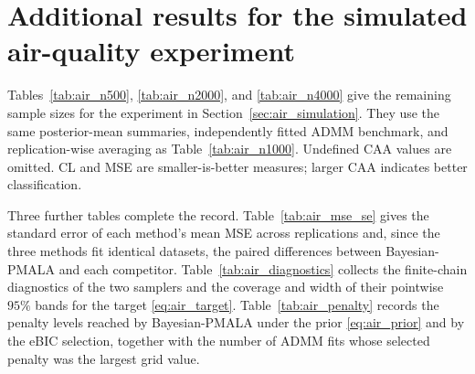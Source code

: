 \clearpage
\section{Additional results for the simulated air-quality experiment}
\label{app:air_simulation}

Tables~\ref{tab:air_n500}, \ref{tab:air_n2000}, and \ref{tab:air_n4000} give the remaining sample sizes for the experiment in Section~\ref{sec:air_simulation}. They use the same posterior-mean summaries, independently fitted ADMM benchmark, and replication-wise averaging as Table~\ref{tab:air_n1000}. Undefined CAA values are omitted. CL and MSE are smaller-is-better measures; larger CAA indicates better classification.

Three further tables complete the record. Table~\ref{tab:air_mse_se} gives the standard error of each method's mean MSE across replications and, since the three methods fit identical datasets, the paired differences between Bayesian-PMALA and each competitor. Table~\ref{tab:air_diagnostics} collects the finite-chain diagnostics of the two samplers and the coverage and width of their pointwise $95\%$ bands for the target \eqref{eq:air_target}. Table~\ref{tab:air_penalty} records the penalty levels reached by Bayesian-PMALA under the prior \eqref{eq:air_prior} and by the eBIC selection, together with the number of ADMM fits whose selected penalty was the largest grid value.

